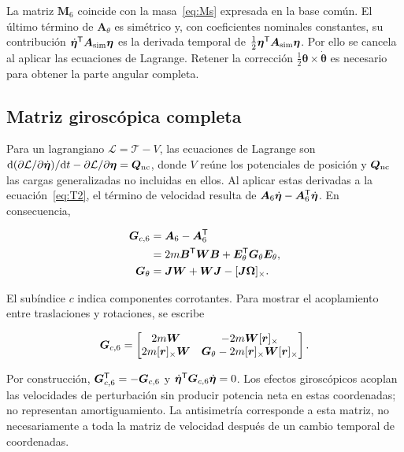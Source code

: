 La matriz $\bm M_6$ coincide con la masa~\eqref{eq:Ms} expresada en la base común. El último término de $\bm A_\theta$ es simétrico y, con coeficientes nominales constantes, su contribución $\dot{\bm\eta}^\mathsf T\bm A_{\rm sim}\bm\eta$ es la derivada temporal de $\tfrac12\bm\eta^\mathsf T\bm A_{\rm sim}\bm\eta$. Por ello se cancela al aplicar las ecuaciones de Lagrange. Retener la corrección $\tfrac12\bm\theta\times\dot{\bm\theta}$ es necesario para obtener la parte angular completa.

\subsection{Matriz giroscópica completa}
Para un lagrangiano $\mathcal L=\mathcal T-V$, las ecuaciones de Lagrange son
$\mathrm d(\partial\mathcal L/\partial\dot{\bm\eta})/\mathrm d t-\partial\mathcal L/\partial\bm\eta=\bm Q_{\rm nc}$,
donde $V$ reúne los potenciales de posición y $\bm Q_{\rm nc}$ las cargas generalizadas no incluidas en ellos. Al aplicar estas derivadas a la ecuación~\eqref{eq:T2}, el término de velocidad resulta de $\bm A_6\dot{\bm\eta}-\bm A_6^\mathsf T\dot{\bm\eta}$. En consecuencia,

\begin{align}
\bm G_{c,6}&=\bm A_6-\bm A_6^\mathsf T\nonumber\\
&=2m\bm B^\mathsf T\bm W\bm B+\bm E_\theta^\mathsf T\bm G_\theta\bm E_\theta,\label{eq:G6}\\
\bm G_\theta&=\bm J\bm W+\bm W\bm J-[\bm{J\Omega}]_\times.
\label{eq:Gtheta}
\end{align}

El subíndice $c$ indica componentes corrotantes. Para mostrar el acoplamiento entre traslaciones y rotaciones, se escribe

\begin{equation}
\bm G_{c,6}=\begin{bmatrix}
2m\bm W&-2m\bm W[\bm{r}]_\times\\
2m[\bm{r}]_\times\bm W&\bm G_\theta-2m[\bm{r}]_\times\bm W[\bm{r}]_\times
\end{bmatrix}.
\label{eq:Gblocks}
\end{equation}

Por construcción, $\bm G_{c,6}^\mathsf T=-\bm G_{c,6}$ y $\dot{\bm\eta}^\mathsf T\bm G_{c,6}\dot{\bm\eta}=0$. Los efectos giroscópicos acoplan las velocidades de perturbación sin producir potencia neta en estas coordenadas; no representan amortiguamiento. La antisimetría corresponde a esta matriz, no necesariamente a toda la matriz de velocidad después de un cambio temporal de coordenadas.

